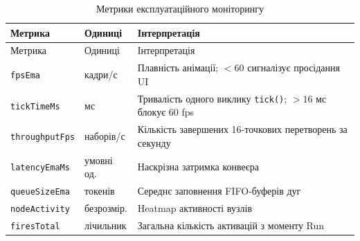 \documentclass[
]{article}
\newcommand{\passthrough}[1]{#1}
\begin{document}
\begin{longtable}[]{@{}
  >{\raggedright\arraybackslash}p{}
  >{\raggedright\arraybackslash}p{}
  >{\raggedright\arraybackslash}p{}@{}}
\caption[Метрики експлуатаційного моніторингу]{Метрики експлуатаційного
моніторингу}\tabularnewline
\toprule\noalign{}
\begin{minipage}[b]{\linewidth}\raggedright
Метрика
\end{minipage} & \begin{minipage}[b]{\linewidth}\raggedright
Одиниці
\end{minipage} & \begin{minipage}[b]{\linewidth}\raggedright
Інтерпретація
\end{minipage} \\
\midrule\noalign{}
\endfirsthead
\toprule\noalign{}
\begin{minipage}[b]{\linewidth}\raggedright
Метрика
\end{minipage} & \begin{minipage}[b]{\linewidth}\raggedright
Одиниці
\end{minipage} & \begin{minipage}[b]{\linewidth}\raggedright
Інтерпретація
\end{minipage} \\
\midrule\noalign{}
\endhead
\bottomrule\noalign{}
\endlastfoot
\passthrough{\lstinline!fpsEma!} & кадри/с & Плавність анімації;
\(< 60\) сигналізує просідання UI \\
\passthrough{\lstinline!tickTimeMs!} & мс & Тривалість одного виклику
\passthrough{\lstinline!tick!}\passthrough{\lstinline!()!}; \(> 16\) мс
блокує 60 fps \\
\passthrough{\lstinline!throughputFps!} & наборів/с & Кількість
завершених 16-точкових перетворень за секунду \\
\passthrough{\lstinline!latencyEmaMs!} & умовні од. & Наскрізна затримка
конвеєра \\
\passthrough{\lstinline!queueSizeEma!} & токенів & Середнє заповнення
FIFO-буферів дуг \\
\passthrough{\lstinline!nodeActivity!} & безрозмір. & Heatmap активності
вузлів \\
\passthrough{\lstinline!firesTotal!} & лічильник & Загальна кількість
активацій з моменту Run \\
\end{longtable}
\end{document}
